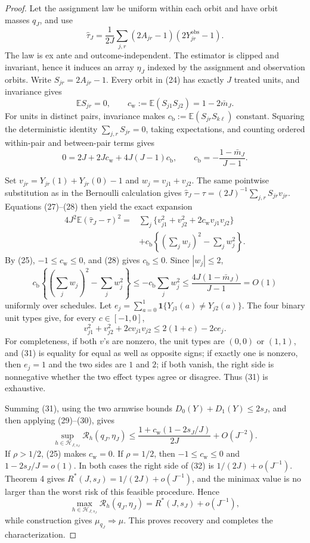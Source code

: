 \documentclass{article}
\begin{document}
\begin{proof}
Let the assignment law be uniform within each orbit and have orbit masses \(q_J\), and use
\[
 \widehat\tau_J
 =\frac1{2J}\sum_{j,r}(2A_{jr}-1)(2Y^{\mathrm{obs}}_{jr}-1).
 \tag{26}
\]
The law is ex ante and outcome-independent.  The estimator is clipped and invariant, hence it induces an array \(\eta_J\) indexed by the assignment and observation orbits.  Write \(S_{jr}=2A_{jr}-1\).  Every orbit in (24) has exactly \(J\) treated units, and invariance gives
\[
 \mathbb E S_{jr}=0,
 \qquad
 c_{\mathrm w}:=\mathbb E(S_{j1}S_{j2})=1-2\bar m_J.
 \tag{27}
\]
For units in distinct pairs, invariance makes \(c_{\mathrm b}:=\mathbb E(S_{jr}S_{k\ell})\) constant.  Squaring the deterministic identity \(\sum_{j,r}S_{jr}=0\), taking expectations, and counting ordered within-pair and between-pair terms gives
\[
 0=2J+2Jc_{\mathrm w}+4J(J-1)c_{\mathrm b},
 \qquad
 c_{\mathrm b}=-\frac{1-\bar m_J}{J-1}.
 \tag{28}
\]

Set \(v_{jr}=Y_{jr}(1)+Y_{jr}(0)-1\) and \(w_j=v_{j1}+v_{j2}\).  The same pointwise substitution as in the Bernoulli calculation gives
\(
 \widehat\tau_J-\tau=(2J)^{-1}\sum_{j,r}S_{jr}v_{jr}
\).  Equations (27)--(28) then yield the exact expansion
\[
\begin{split}
 4J^2\mathbb E(\widehat\tau_J-\tau)^2
 ={}&\sum_j\{v_{j1}^2+v_{j2}^2
       +2c_{\mathrm w}v_{j1}v_{j2}\}\\
 &+c_{\mathrm b}\left\{
       \left(\sum_jw_j\right)^2-\sum_jw_j^2
       \right\}.
\end{split}
 \tag{29}
\]
By (25), \(-1\le c_{\mathrm w}\le0\), and (28) gives \(c_{\mathrm b}\le0\).  Since \(|w_j|\le2\),
\[
 c_{\mathrm b}\left\{
 (\sum_jw_j)^2-\sum_jw_j^2\right\}
 \le -c_{\mathrm b}\sum_jw_j^2
 \le\frac{4J(1-\bar m_J)}{J-1}=O(1)
 \tag{30}
\]
uniformly over schedules.  Let
\(
 e_j=\sum_{a=0}^1\mathbf 1\{Y_{j1}(a)\ne Y_{j2}(a)\}
\).  The four binary unit types give, for every \(c\in[-1,0]\),
\[
 v_{j1}^2+v_{j2}^2+2cv_{j1}v_{j2}
 \le2(1+c)-2ce_j.
 \tag{31}
\]
For completeness, if both \(v\)'s are nonzero, the unit types are \((0,0)\) or \((1,1)\), and (31) is equality for equal as well as opposite signs; if exactly one is nonzero, then \(e_j=1\) and the two sides are \(1\) and \(2\); if both vanish, the right side is nonnegative whether the two effect types agree or disagree.  Thus (31) is exhaustive.

Summing (31), using the two armwise bounds \(D_0(Y)+D_1(Y)\le2s_J\), and then applying (29)--(30), gives
\[
 \sup_{h\in\mathcal H_{J,s_J}}
 \mathcal R_h(q_J,\eta_J)
 \le
 \frac{1+c_{\mathrm w}(1-2s_J/J)}{2J}
 +O(J^{-2}).
 \tag{32}
\]
If \(\rho>1/2\), (25) makes \(c_{\mathrm w}=0\).  If \(\rho=1/2\), then \(-1\le c_{\mathrm w}\le0\) and \(1-2s_J/J=o(1)\).  In both cases the right side of (32) is \(1/(2J)+o(J^{-1})\).  Theorem 4 gives \(R^*(J,s_J)=1/(2J)+o(J^{-1})\), and the minimax value is no larger than the worst risk of this feasible procedure.  Hence
\[
 \max_{h\in\mathcal H_{J,s_J}}\mathcal R_h(q_J,\eta_J)
 =R^*(J,s_J)+o(J^{-1}),
\]
while construction gives \(\mu_{q_J}\Rightarrow\mu\).  This proves recovery and completes the characterization.
\end{proof}
\end{document}
